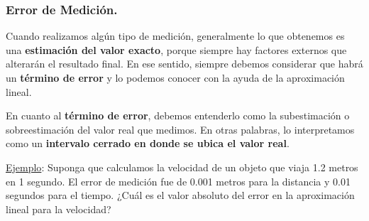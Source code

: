 \documentclass[12pt]{article}
\begin{document}
\subsubsection{Error de Medición.}

Cuando realizamos algún tipo de medición, generalmente lo que obtenemos es una \textbf{estimación del valor exacto}, porque siempre hay factores externos que alterarán el resultado final. En ese sentido, siempre debemos considerar que habrá un \textbf{término de error} y lo podemos conocer con la ayuda de la aproximación lineal.

En cuanto al \textbf{término de error}, debemos entenderlo como la subestimación o sobreestimación del valor real que medimos. En otras palabras, lo interpretamos como un \textbf{intervalo cerrado en donde se ubica el valor real}.

\underline{Ejemplo}: Suponga que calculamos la velocidad de un objeto que viaja 1.2 metros en 1 segundo. El error de medición fue de 0.001 metros para la distancia y 0.01 segundos para el tiempo. ¿Cuál es el valor absoluto del error en la aproximación lineal para la velocidad?
\end{document}
